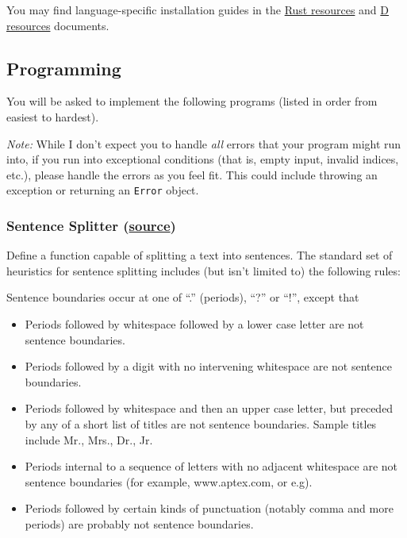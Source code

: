 You may find language-specific installation guides in the
\href{./rust_resources.md}{Rust resources} and \href{./d_resources.md}{D
resources} documents.

\subsection{Programming}\label{programming}

You will be asked to implement the following programs (listed in order
from easiest to hardest).

\emph{Note:} While I don't expect you to handle \emph{all} errors that
your program might run into, if you run into exceptional conditions
(that is, empty input, invalid indices, etc.), please handle the errors
as you feel fit. This could include throwing an exception or returning
an \lstinline!Error! object.

\subsubsection{\texorpdfstring{Sentence Splitter
(\href{http://www.ling.gu.se/~lager/python_exercises.html}{source})}{Sentence Splitter (source)}}\label{sentence-splitter-sourcesentence-splitter}

Define a function capable of splitting a text into sentences. The
standard set of heuristics for sentence splitting includes (but isn't
limited to) the following rules:

Sentence boundaries occur at one of ``.'' (periods), ``?'' or ``!'',
except that

\begin{itemize}
\itemsep1pt\parskip0pt
\item
  Periods followed by whitespace followed by a lower case letter are not
  sentence boundaries.
\item
  Periods followed by a digit with no intervening whitespace are not
  sentence boundaries.
\item
  Periods followed by whitespace and then an upper case letter, but
  preceded by any of a short list of titles are not sentence boundaries.
  Sample titles include Mr., Mrs., Dr., Jr.
\item
  Periods internal to a sequence of letters with no adjacent whitespace
  are not sentence boundaries (for example, www.aptex.com, or e.g).
\item
  Periods followed by certain kinds of punctuation (notably comma and
  more periods) are probably not sentence boundaries.
\end{itemize}

